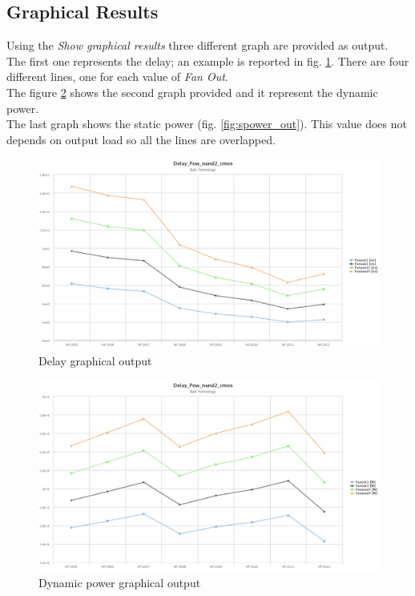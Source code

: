 \documentclass[12pt,  english, makeidx, a4paper, titlepage, oneside]{article}
\begin{document}
\subsection{Graphical Results}
Using the  \textit{Show graphical results} three different graph are provided as output. The first one represents the delay; an example is reported in fig. \ref{fig:delay_out}. There are four different lines, one for each value of \textit{Fan Out}. \\
The figure \ref{fig:dpower_out} shows the second graph provided and it represent the dynamic power.\\ The last graph shows the static power (fig. \ref{fig:spower_out}). This value does not depends on output load so all the lines are overlapped.\\
\begin{figure}[htbp]
	\begin{center}
		\includegraphics[width=17cm]{img/Delay_Pow_nand2_cmos_Delay.jpeg}
		\caption{Delay graphical output}
		\label{fig:delay_out}
	\end{center}
\end{figure}

\begin{figure}[htbp]
	\begin{center}
		\includegraphics[width=17cm]{img/Delay_Pow_nand2_cmos_Dpower.jpeg}
		\caption{Dynamic power graphical output}
		\label{fig:dpower_out}
	\end{center}
\end{figure}
\end{document}
